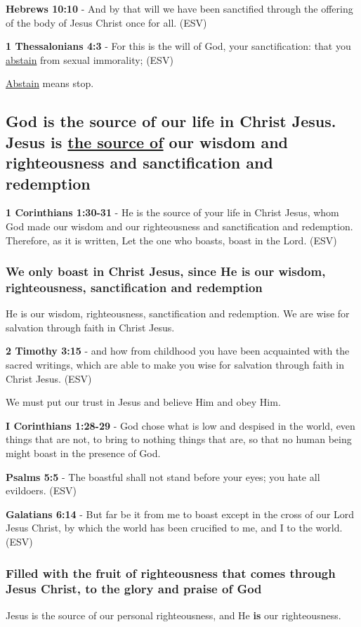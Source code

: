 \documentclass[11pt]{article}
\begin{document}
\textbf{Hebrews 10:10} - And by that will we have been sanctified through the offering of the body of Jesus Christ once for all. (ESV)

\textbf{1 Thessalonians 4:3} -  For this is the will of God, your sanctification: that you \uline{abstain} from sexual immorality;  (ESV)

\uline{Abstain} means stop.

\subsection{God is the source of our life in Christ Jesus. Jesus is \underline{the source of} our wisdom and righteousness and sanctification and redemption}
\label{sec:org9d70d77}
\textbf{1 Corinthians 1:30-31} -  He is the source of your life in Christ Jesus, whom God made our wisdom and our righteousness and sanctification and redemption.  Therefore, as it is written, Let the one who boasts, boast in the Lord.  (ESV)

\subsubsection{We only boast in Christ Jesus, since He is our wisdom, righteousness, sanctification and redemption}
\label{sec:org3ed6cb4}
He is our wisdom, righteousness, sanctification and redemption.
We are wise for salvation through faith in Christ Jesus.

\textbf{2 Timothy 3:15} -  and how from childhood you have been acquainted with the sacred writings, which are able to make you wise for salvation through faith in Christ Jesus.  (ESV)

We must put our trust in Jesus and believe Him and obey Him.

\textbf{I Corinthians 1:28-29} - God chose what is low and despised in the world, even things that are not, to bring to nothing things that are, so that no human being might boast in the presence of God.

\textbf{Psalms 5:5} -  The boastful shall not stand before your eyes; you hate all evildoers.  (ESV)

\textbf{Galatians 6:14} -  But far be it from me to boast except in the cross of our Lord Jesus Christ, by which the world has been crucified to me, and I to the world.  (ESV)

\subsubsection{Filled with the fruit of righteousness that comes through Jesus Christ, to the glory and praise of God}
\label{sec:orgc90e8ee}
Jesus is the source of our personal righteousness, and He \textbf{is} our righteousness.
\end{document}
